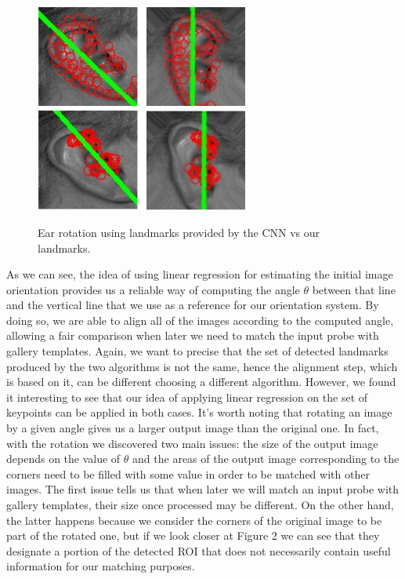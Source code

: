 \documentclass{article}
\begin{document}
\begin{figure}[h]
    \label{fig:rotation}
    \begin{center}
        \includegraphics[width=7cm,keepaspectratio]{images/rotation.png}\\
        \includegraphics[width=7cm,keepaspectratio]{images/rotation2.png}
        \caption{Ear rotation using landmarks provided by the CNN vs our landmarks.}
    \end{center}
\end{figure}

As we can see, the idea of using linear regression for estimating the initial image orientation
provides us a reliable way of computing the angle $\theta$ between that line and the vertical line
that we use as a reference for our orientation system. By doing so, we are able to align all of the
images according to the computed angle, allowing a fair comparison when later we need to match the input
probe with gallery templates. 
Again, we want to precise that the set of detected landmarks produced by the two algorithms
is not the same, hence the alignment step, which is based on it, can be different choosing a
different algorithm. However, we found it interesting to see that our idea of applying linear
regression on the set of keypoints can be applied in both cases.
It's worth noting that rotating an image by a given angle gives us a larger
output image than the original one. In fact, with the rotation we discovered two main issues: the size
of the output image depends on the value of $\theta$ and the areas of the output image corresponding to
the corners need to be filled with some value in order to be matched with other images. The first issue
tells us that when later we will match an input probe with gallery templates, their size once processed
may be different. On the other hand, the latter happens because we consider the corners of the original
image to be part of the rotated one, but if we look closer at Figure 2 we can see
that they designate a
portion of the detected ROI that does not necessarily contain useful information for our matching purposes.
\end{document}
